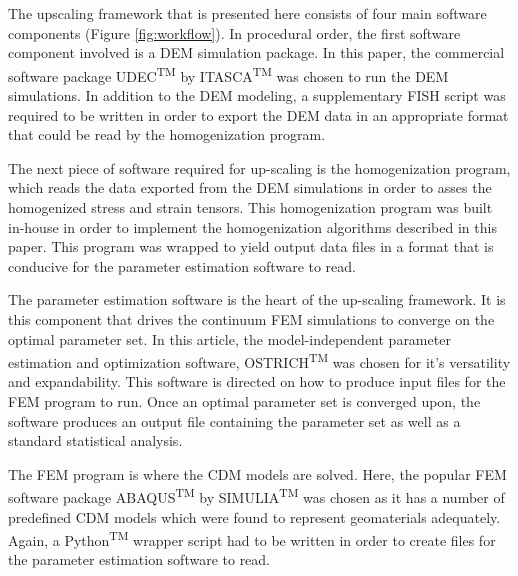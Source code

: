 The upscaling framework that is presented here consists of four main software components (Figure \ref{fig:workflow}). In procedural order, the first software component involved is a DEM simulation package. In this paper, the commercial software package UDEC\textsuperscript{TM} by ITASCA\textsuperscript{TM} was chosen to run the DEM simulations. In addition to the DEM modeling, a supplementary FISH script was required to be written in order to export the DEM data in an appropriate format that could be read by the homogenization program. 

The next piece of software required for up-scaling is the homogenization program, which reads the data exported from the DEM simulations in order to asses the homogenized stress and strain tensors. This homogenization program was built in-house in order to implement the homogenization algorithms described in this paper. This program was wrapped to yield output data files in a format that is conducive for the parameter estimation software to read. 

The parameter estimation software is the heart of the up-scaling framework. It is this component that drives the continuum FEM simulations to converge on the optimal parameter set. In this article, the model-independent parameter estimation and optimization software, OSTRICH\textsuperscript{TM} was chosen for it's versatility and expandability. This software is directed on how to produce input files for the FEM program to run. Once an optimal parameter set is converged upon, the software produces an output file containing the parameter set as well as a standard statistical analysis.

The FEM program is where the CDM models are solved. Here, the popular FEM software package ABAQUS\textsuperscript{TM} by SIMULIA\textsuperscript{TM} was chosen as it has a number of predefined CDM models which were found to represent geomaterials adequately. Again, a Python\textsuperscript{TM} wrapper script had to be written in order to create files for the parameter estimation software to read. 